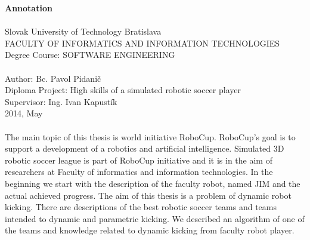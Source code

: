 \begin{titlepage}
\large \textbf{Annotation} \\ \\
\normalsize
Slovak University of Technology Bratislava \\
FACULTY OF INFORMATICS AND INFORMATION TECHNOLOGIES \\
Degree Course: SOFTWARE ENGINEERING  \\
 \\
Author: Bc. Pavol Pidanič \\
Diploma Project: High skills of a simulated robotic soccer player \\ 
Supervisor: Ing. Ivan Kapustík  \\
2014, May \\
\\
The main topic of this thesis is world initiative RoboCup. RoboCup's goal is to support a development of a robotics and artificial intelligence. Simulated 3D robotic soccer league is part of RoboCup initiative and it is in the aim of researchers at Faculty of informatics and information technologies. In the beginning we start with the description of the faculty robot, named JIM and the actual achieved progress. The aim of this thesis is a problem of dynamic robot kicking. There are descriptions of the best robotic soccer teams and teams intended to dynamic and parametric kicking. We described an algorithm of one of the teams and knowledge related to dynamic kicking from faculty robot player.


\end{titlepage}